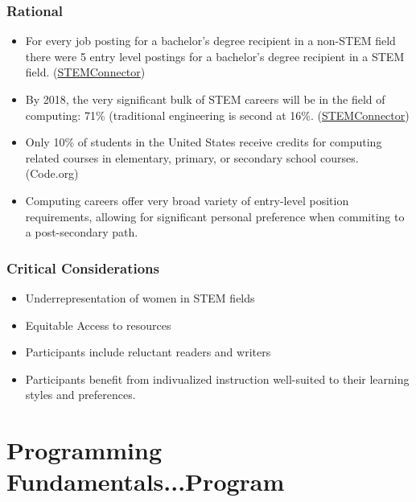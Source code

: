 \documentclass[letterpaper,10pt,english]{sphinxmanual}
\begin{document}
\subsection{Rational}
\label{philosophy:rational}\begin{itemize}
\item {} 
For every job posting for a bachelor's degree recipient in a non-STEM field there were 5 entry level postings for a bachelor's degree recipient in a STEM field. (\href{http://www.stemconnector.org/sites/default/files/store/STEM-Students-STEM-Jobs-Executive-Summary.pdf}{STEMConnector})

\item {} 
By 2018, the very significant bulk of STEM careers will be in the field of computing: 71\% (traditional engineering is second at 16\%. (\href{http://www.stemconnector.org/sites/default/files/store/STEM-Students-STEM-Jobs-Executive-Summary.pdf}{STEMConnector})

\item {} 
Only 10\% of students in the United States receive credits for computing related courses in elementary, primary, or secondary school courses. (Code.org)

\item {} 
Computing careers offer very broad variety of entry-level position requirements, allowing for significant personal preference when commiting to a post-secondary path.

\end{itemize}


\subsection{Critical Considerations}
\label{philosophy:critical-considerations}\begin{itemize}
\item {} 
Underrepresentation of women in STEM fields

\item {} 
Equitable Access to resources

\item {} 
Participants include reluctant readers and writers

\item {} 
Participants benefit from indivualized instruction well-suited to their learning styles and preferences.

\end{itemize}


\chapter{Programming Fundamentals...Program}
\label{programming::doc}\label{programming:programming-fundamentals-program}
\end{document}
